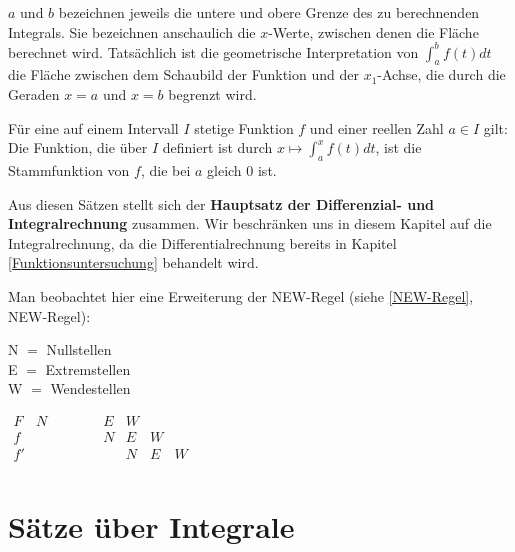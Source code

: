 \documentclass[main.tex]{subfiles}
\begin{document}
\begin{Bemerkung}
  $a$ und $b$ bezeichnen jeweils die untere und obere Grenze des zu berechnenden Integrals. Sie bezeichnen anschaulich die $x$-Werte, zwischen denen die Fläche berechnet wird. Tatsächlich ist die geometrische Interpretation von $\displaystyle{\int_a^b f(t)dt}$ die Fläche zwischen dem Schaubild der Funktion und der $x_1$-Achse, die durch die Geraden $x=a$ und $x=b$ begrenzt wird.
\end{Bemerkung}

\begin{Theorem}
  Für eine auf einem Intervall $I$ stetige Funktion $f$ und einer reellen Zahl $a\in I$ gilt: Die Funktion, die über $I$ definiert ist durch $x\mapsto\displaystyle{\int_a^xf(t)dt}$, ist die Stammfunktion von $f$, die bei $a$ gleich $0$ ist.
\end{Theorem}

Aus diesen Sätzen stellt sich der \textbf{Hauptsatz der Differenzial- und Integralrechnung} zusammen. Wir beschränken uns in diesem Kapitel auf die Integralrechnung, da die Differentialrechnung bereits in Kapitel \ref{Funktionsuntersuchung} behandelt wird.\\
\begin{Bemerkung}
  Man beobachtet hier eine Erweiterung der NEW-Regel (siehe \ref{NEW-Regel}, NEW-Regel):

  \begin{minipage}[b]{0.2\linewidth}
    N $=$ Nullstellen\\
    E $=$ Extremstellen\\
    W $=$ Wendestellen
  \end{minipage}
  \hfill \vline \hfill
  \begin{minipage}[b]{0.4\linewidth}
    $\begin{array}{rcccccl}
      F &   N & E & W & & \\
      f & \qquad \qquad& N & E & W & & \\
      f' & \qquad \qquad && N & E & W & \\
    \end{array}$
  \end{minipage}
\end{Bemerkung}


\section{Sätze über Integrale}
\end{document}
